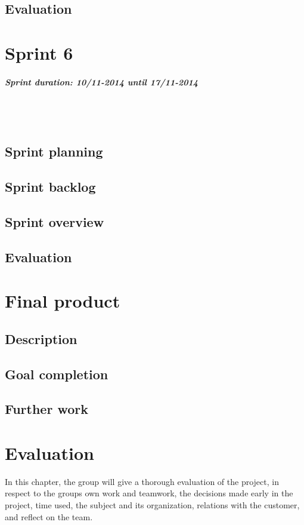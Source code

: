 \documentclass[11pt,a4paper,titlepage,oneside]{report}
\begin{document}
\section{Evaluation}


\chapter{Sprint 6}
\paragraph{Sprint duration: 10/11-2014 until 17/11-2014} \hfill \\
\\
\noindent
\section{Sprint planning}
\section{Sprint backlog}
\section{Sprint overview}
\section{Evaluation}

\chapter{Final product}
\section{Description}
\section{Goal completion}
\section{Further work}

\chapter{Evaluation}
In this chapter, the group will give a thorough evaluation of the project, in respect to the groups own work and teamwork, the decisions made early in the project, time used, the subject and its organization, relations with the customer, and reflect on the team. 
\end{document}
